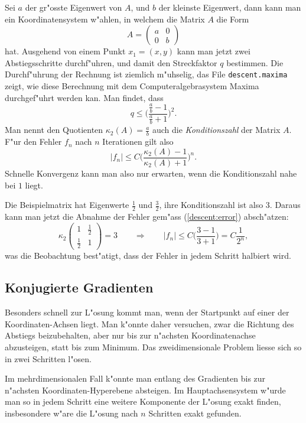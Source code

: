 Sei $a$ der gr"osste Eigenwert von $A$, und $b$ der kleinste Eigenwert,
dann kann man ein Koordinatensystem w"ahlen, in welchem die Matrix $A$
die Form
\[
A=\begin{pmatrix}a&0\\0&b\end{pmatrix}
\]
hat.
Ausgehend von einem Punkt $x_1=(x,y)$ kann man jetzt zwei Abstiegsschritte
durchf"uhren, und damit den Streckfaktor $q$ bestimmen.
Die Durchf"uhrung der Rechnung ist ziemlich m"uhselig, das
File \verb+descent.maxima+ zeigt, wie diese Berechnung mit dem
Computeralgebrasystem Maxima durchgef"uhrt werden kan. Man findet,
dass 
\[
q\le \biggl(\frac{\frac{a}{b}-1}{\frac{a}{b}+1}\biggr)^2.
\]
Man nennt den Quotienten $\kappa_2(A)=\frac{a}{b}$ auch die
{\em Konditionszahl} der Matrix $A$.
F"ur den Fehler $f_n$ nach $n$ Iterationen gilt also
\begin{equation}
|f_n| \le C\biggl(\frac{\kappa_2(A)-1}{\kappa_2(A)+1}\biggr)^n.
\label{descent:error}
\end{equation}
Schnelle Konvergenz kann man also nur erwarten, wenn die Konditionszahl
nahe bei $1$ liegt.

\begin{beispiel}
Die Beispielmatrix hat Eigenwerte $\frac12$ und $\frac32$, ihre
Konditionszahl ist also 3.
Daraus kann man jetzt die Abnahme der Fehler gem"ass (\ref{descent:error})
absch"atzen:
\[
\kappa_2
\begin{pmatrix}1&\frac12\\\frac12&1\end{pmatrix}
=
3\qquad\Rightarrow\qquad
|f_n|\le C\biggl(\frac{3-1}{3+1}\biggr)=C\frac1{2^n},
\]
was die Beobachtung best"atigt, dass der Fehler in jedem Schritt halbiert
wird.
\end{beispiel}

\subsection{Konjugierte Gradienten}
Besonders schnell zur L"osung kommt man, wenn der Startpunkt auf einer
der Koordinaten-Achsen liegt.
Man k"onnte daher versuchen, zwar die Richtung des Abstiegs beizubehalten,
aber nur bis zur n"achsten Koordinatenachse abzusteigen, statt bis zum
Minimum.
Das zweidimensionale Problem liesse sich so in zwei Schritten l"osen.

Im mehrdimensionalen Fall k"onnte man entlang des Gradienten bis zur
n"achsten Koordinaten-Hyperebene absteigen.
Im Hauptachsensystem w"urde man so in jedem Schritt eine weitere Komponente
der L"osung exakt finden, insbesondere w"are die L"osung nach $n$
Schritten exakt gefunden.

